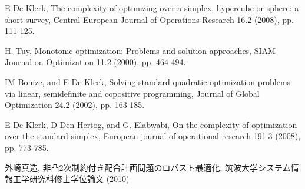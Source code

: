 \documentclass[a4paper,11pt]{jreport}
\begin{document}
\begin{thebibliography}{1}

E De Klerk,
\newblock The complexity of optimizing over a simplex, hypercube or sphere: a short survey,
\newblock Central European Journal of Operations Research 16.2 (2008), pp. 111-125.

H. Tuy,
\newblock Monotonic optimization: Problems and solution approaches,
\newblock SIAM Journal on Optimization 11.2 (2000), pp. 464-494.

IM Bomze, and E De Klerk,
\newblock Solving standard quadratic optimization problems via linear, semidefinite and copositive programming,
\newblock Journal of Global Optimization 24.2 (2002), pp. 163-185.

E De Klerk, D Den Hertog, and G. Elabwabi,
\newblock On the complexity of optimization over the standard simplex,
\newblock European journal of operational research 191.3 (2008), pp. 773-785.



外崎真造,
\newblock 非凸2次制約付き配合計画問題のロバスト最適化,
\newblock 筑波大学システム情報工学研究科修士学位論文 (2010)
\end{thebibliography}
\end{document}
